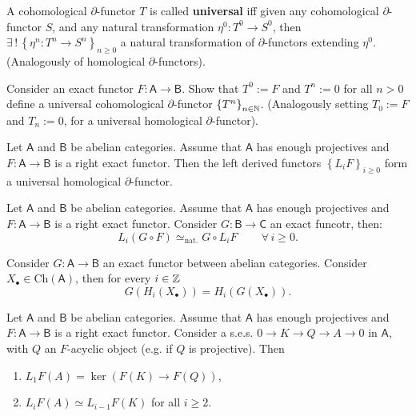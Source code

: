 \begin{defn}
	A cohomological $\partial$-functor $T$ is called \textbf{universal} iff
	given any cohomological $\partial$-functor $S$, and any natural
	transformation $\eta^0: T^0 \to S^0$, then
	$\exists\, !\, \left\{ \eta^n: T^n \to S^n \right\}_{n \geq 0}$	a natural transformation
	of $\partial$-functors extending $\eta^0$.
	(Analogously of homological $\partial$-functors).
\end{defn}

\begin{lem}
	Consider an exact functor $F: \mathsf{A} \to \mathsf{B}$.
	Show that $T^0 := F$ and $T^n := 0$ for all $n > 0$
	define  a universal cohomological $\partial$-functor $\left\{ T^n \right\}_{n \in \mathbb{N}}$.
	(Analogously setting $T_0 := F$ and $T_n := 0$, for a universal homological
	$\partial$-functor).
\end{lem}  

\begin{thm}[]
	Let $\mathsf{A}$ and $\mathsf{B}$ be abelian categories.
	Assume that $\mathsf{A}$ has enough projectives and $F: \mathsf{A} \to \mathsf{B}$
	is a right exact functor.
	Then the left derived functors $\left\{ L_i F \right\}_{i \geq 0}$
	form a universal homological $\partial$-functor.
\end{thm}

\begin{lem}
	Let $\mathsf{A}$ and $\mathsf{B}$ be abelian categories.
	Assume that $\mathsf{A}$ has enough projectives and $F: \mathsf{A} \to \mathsf{B}$
	is a right exact functor.
	Consider $G: \mathsf{B} \to \mathsf{C}$	an exact funcotr, then:
	\begin{equation}
		L_i \left( G \circ F \right) \simeq_{\text{nat.}} G \circ L_i F
		\qquad \,\forall\, i \geq 0
	.\end{equation} 
\end{lem} 

\begin{lem}
	Consider $G: \mathsf{A} \to \mathsf{B}$ an exact functor between abelian categories.
	Consider $X_{\bullet} \in \mathrm{Ch}(\mathsf{A})$, then for every $i \in \mathbb{Z}$
	\begin{equation}
		G \left( H_{i}\left( X_{\bullet} \right) \right) =
		H_{i}\left( G(X_{\bullet}) \right)
	.\end{equation} 
\end{lem} 

\begin{lem}
	Let $\mathsf{A}$ and $\mathsf{B}$ be abelian categories.
	Assume that $\mathsf{A}$ has enough projectives and $F: \mathsf{A} \to \mathsf{B}$
	is a right exact functor.
	Consider a s.e.s. $0 \to K \to Q \to A \to 0$ in $\mathsf{A}$,
	with $Q$ an $F$-acyclic object (e.g. if $Q$ is projective).
	Then
	\begin{enumerate}
		\item $L_1 F(A) = \ker \left( F(K) \to F(Q) \right)$,
		\item $L_iF(A) \simeq L_{i-1} F(K)$ for all $i \geq 2$.
	\end{enumerate}
\end{lem} 

